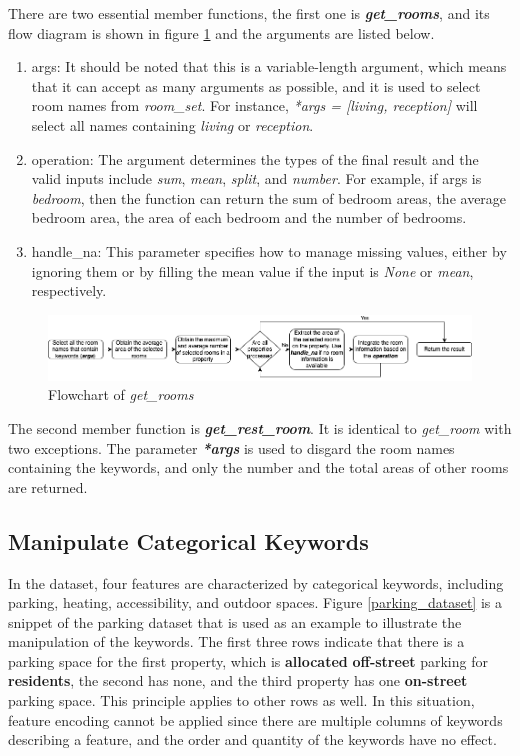 \documentclass[12pt,twoside]{report}
\begin{document}
There are two essential member functions, the first one is \textit{\textbf{get\_rooms}}, and its flow diagram is shown in figure \ref{extract_room_get_rooms} and the arguments are listed below. 
\begin{enumerate}
	\item args: It should be noted that this is a variable-length argument, which means that it can accept as many arguments as possible, and it is used to select room names from \textit{room\_set}. For instance, \textit{*args = [living, reception]} will select all names containing \textit{living} or \textit{reception}. 
	\item operation: The argument determines the types of the final result and the valid inputs include \textit{sum}, \textit{mean}, \textit{split}, and \textit{number}. For example, if args is \textit{bedroom}, then the function can return the sum of bedroom areas, the average bedroom area, the area of each bedroom and the number of bedrooms. 
	\item handle\_na: This parameter specifies how to manage missing values, either by ignoring them or by filling the mean value if the input is \textit{None} or \textit{mean}, respectively. 
\end{enumerate} 

\begin{figure}[!htbp]
	\centering
	\includegraphics[width=\linewidth]{extract_room_get_rooms}
	\caption{Flowchart of \textit{get\_rooms}}
	\label{extract_room_get_rooms}
\end{figure}

The second member function is \textit{\textbf{get\_rest\_room}}. It is identical to \textit{get\_room} with two exceptions. The parameter \textit{\textbf{*args}} is used to disgard the room names containing the keywords, and only the number and the total areas of other rooms are returned. 

\subsection{Manipulate Categorical Keywords}
In the dataset, four features are characterized by categorical keywords, including parking, heating, accessibility, and outdoor spaces. Figure \ref{parking_dataset} is a snippet of the parking dataset that is used as an example to illustrate the manipulation of the keywords. The first three rows indicate that there is a parking space for the first property, which is \textbf{allocated} \textbf{off-street} parking for \textbf{residents}, the second has none, and the third property has one \textbf{on-street} parking space. This principle applies to other rows as well. In this situation, feature encoding cannot be applied since there are multiple columns of keywords describing a feature, and the order and quantity of the keywords have no effect.
\\
\end{document}
